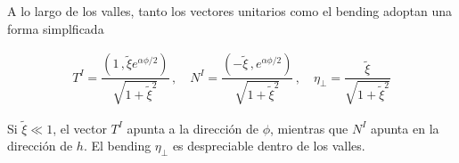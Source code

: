 \documentclass[12pt,a4paper,english,nofootinbib]{revtex4}
\newcommand{\beq}{\begin{eqnarray}}
\newcommand{\enq}{\end{eqnarray}}
\begin{document}
A lo largo de los valles, tanto los vectores unitarios como el bending adoptan una forma simplficada

\beq 
    T^I = \dfrac{(1\,, \tilde{\xi} e^{\alpha\phi/2})}{\sqrt{1 + \tilde{\xi}^2}}\,,\quad N^I = \dfrac{(-\tilde{\xi}\,,  e^{\alpha\phi/2})}{\sqrt{1 + \tilde{\xi}^2}}\,, \quad \eta_\perp = \dfrac{\tilde{\xi}}{\sqrt{1 + \tilde{\xi}^2}}
    \label{valley approach}
\enq

Si $\tilde{\xi} \ll 1$, el vector $T^I$ apunta a la dirección de $\phi$, mientras que $N^I$ apunta en la dirección de $h$. El bending $\eta_\perp$ es despreciable dentro de los valles. 








\end{document}
